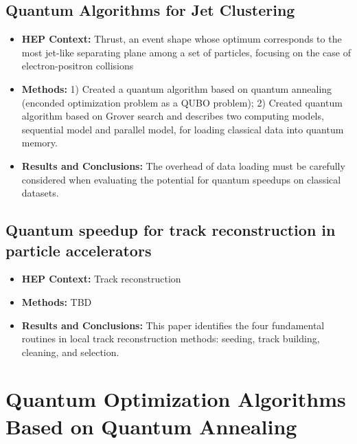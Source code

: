 \subsection{Quantum Algorithms for Jet Clustering~\cite{Wei:2019rqy}}
\begin{itemize}
	\item \textbf{HEP Context: }Thrust, an event shape whose optimum corresponds to the most jet-like separating plane among a set of particles, focusing on the case of electron-positron collisions
	\item \textbf{Methods: }1) Created a quantum algorithm based on quantum annealing (enconded optimization problem as a QUBO problem); 2) Created quantum algorithm based on Grover search and describes two computing models, sequential model and parallel model, for loading classical data into quantum memory.
	\item \textbf{Results and Conclusions: }The overhead of data loading must be carefully considered when evaluating the potential for quantum speedups on classical datasets.
\end{itemize}\subsection{Quantum speedup for track reconstruction in particle accelerators~\cite{Magano:2021jzd}}
\begin{itemize}
	\item \textbf{HEP Context: }Track reconstruction
	\item \textbf{Methods: }TBD
	\item \textbf{Results and Conclusions: }This paper identifies the four fundamental routines in local track reconstruction methods: seeding, track building, cleaning, and selection. 
\end{itemize}

\section{Quantum Optimization Algorithms Based on Quantum Annealing}

